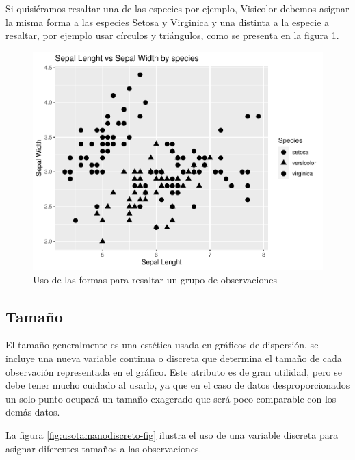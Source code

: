 \documentclass[
]{book}
\begin{document}
Si quisiéramos resaltar una de las especies por ejemplo, Visicolor debemos asignar la misma forma a las especies Setosa y Virginica y una distinta a la especie a resaltar, por ejemplo usar círculos y triángulos, como se presenta en la figura \ref{fig:formaspararesaltar-fig}.

\begin{figure}

{\centering \includegraphics[width=0.8\linewidth]{Lineamientos-Visualizar_files/figure-latex/formaspararesaltar-fig-1} 

}

\caption{Uso de las formas para resaltar un grupo de observaciones}\label{fig:formaspararesaltar-fig}
\end{figure}

\hypertarget{tamauxf1o}{%
\subsection{Tamaño}\label{tamauxf1o}}

El tamaño generalmente es una estética usada en gráficos de dispersión, se incluye una nueva variable continua o discreta que determina el tamaño de cada observación representada en el gráfico. Este atributo es de gran utilidad, pero se debe tener mucho cuidado al usarlo, ya que en el caso de datos desproporcionados un solo punto ocupará un tamaño exagerado que será poco comparable con los demás datos.

La figura \ref{fig:usotamanodiscreto-fig} ilustra el uso de una variable discreta para asignar diferentes tamaños a las observaciones.
\end{document}
